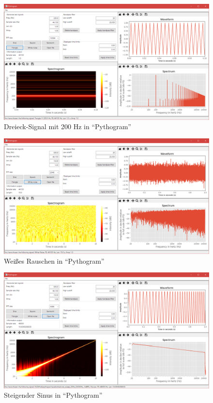 \documentclass[a4paper]{article}
\begin{document}
\begin{figure}[H]
    \centering
    \begin{minipage}{1.0\textwidth}
        \centering
        \includegraphics[width=1.0\textwidth]{Triangle_200Hz.png}
        \caption{Dreieck-Signal mit 200 Hz in "`Pythogram"'}
    \end{minipage}
\end{figure}
\begin{figure}[H]
    \centering
    \begin{minipage}{1.0\textwidth}
        \centering
        \includegraphics[width=1.0\textwidth]{WNoise.png}
        \caption{Weißes Rauschen in "`Pythogram"'}
    \end{minipage}
\end{figure}
\begin{figure}[H]
    \centering
    \begin{minipage}{1.0\textwidth}
        \centering
        \includegraphics[width=1.0\textwidth]{Sine_Sweep.png}
        \caption{Steigender Sinus in "`Pythogram"'}
    \end{minipage}
\end{figure}
\end{document}
